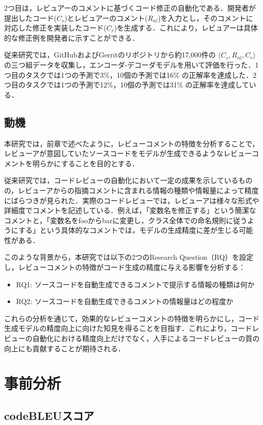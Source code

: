 \documentclass[11pt]{jreport}
\newcommand{\RQone}{ソースコードを自動生成できるコメントで提示する情報の種類は何か}
\newcommand{\RQtwo}{ソースコードを自動生成できるコメントの情報量はどの程度か}
\begin{document}
2つ目は，レビュアーのコメントに基づくコード修正の自動化である．開発者が提出したコード($C_s$)とレビュアーのコメント($R_{nl}$)を入力とし，そのコメントに対応した修正を実装したコード($C_r$)を生成する．これにより，レビュアーは具体的な修正例を開発者に示すことができる．

従来研究では，GitHubおよびGerritのリポジトリから約17,000件の $\langle C_s, R_{nl}, C_r \rangle$ の三つ組データを収集し，エンコーダ-デコーダモデルを用いて評価を行った．1つ目のタスクでは1つの予測で3\%，10個の予測では16\% の正解率を達成した．2つ目のタスクでは1つの予測で12\%，10個の予測では31\% の正解率を達成している．

\section{動機}
本研究では，前章で述べたように，レビューコメントの特徴を分析することで，レビューアが意図していたソースコードをモデルが生成できるようなレビューコメントを明らかにすることを目的とする．

従来研究では，コードレビューの自動化において一定の成果を示しているものの，レビューアからの指摘コメントに含まれる情報の種類や情報量によって精度にばらつきが見られた．実際のコードレビューでは，レビューアは様々な形式や詳細度でコメントを記述している．例えば，「変数名を修正する」という簡潔なコメントと，「変数名をfooからbarに変更し，クラス全体での命名規則に従うようにする」という具体的なコメントでは，モデルの生成精度に差が生じる可能性がある．

このような背景から，本研究では以下の2つのResearch Question（RQ）を設定し，レビューコメントの特徴がコード生成の精度に与える影響を分析する：

\begin{itemize}
   \item RQ1: \RQone
   \item RQ2: \RQtwo
\end{itemize}

これらの分析を通じて，効果的なレビューコメントの特徴を明らかにし，コード生成モデルの精度向上に向けた知見を得ることを目指す．これにより，コードレビューの自動化における精度向上だけでなく，人手によるコードレビューの質の向上にも貢献することが期待される．

\chapter{事前分析}\label{chap:fig-tab-exp}

\section {codeBLEUスコア}
\end{document}
